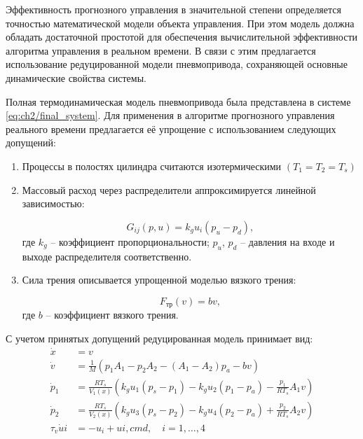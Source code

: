 Эффективность прогнозного управления в значительной степени определяется точностью
математической модели объекта управления. При этом модель должна обладать достаточной
простотой для обеспечения вычислительной эффективности алгоритма управления в
реальном времени. В связи с этим предлагается использование редуцированной
модели пневмопривода, сохраняющей основные динамические свойства системы.

Полная термодинамическая модель пневмопривода была представлена в системе \ref{eq:ch2/final_system}. Для применения в
алгоритме прогнозного управления реального времени предлагается её упрощение с использованием следующих допущений:

\begin{enumerate}
	\item Процессы в полостях цилиндра считаются изотермическими $(T_1 = T_2 = T_s)$
	\item Массовый расход через распределители аппроксимируется линейной зависимостью:

	      \begin{equation}
		      G_{ij}(p,u) = k_g u_i (p_u - p_d),
	      \end{equation}
	      где $k_g$ -- коэффициент пропорциональности;
	      $p_u$, $p_d$ -- давления на входе и выходе распределителя соответственно.

	\item Сила трения описывается упрощенной моделью вязкого трения:

	      \begin{equation}
		      F_{\text{тр}}(v) = b v,
	      \end{equation}
	      где $b$ -- коэффициент вязкого трения.
\end{enumerate}

С учетом принятых допущений редуцированная модель принимает вид:
\begin{equation}
	\begin{aligned}
		\dot{x}        & = v                                                                                   \\
		\dot{v}        & = \frac{1}{M}(p_1A_1 - p_2A_2 - (A_1-A_2)p_a - bv)                                    \\
		\dot{p}_1      & = \frac{RT_s}{V_1(x)}(k_g u_1(p_s - p_1) - k_g u_2(p_1 - p_a) - \frac{p_1}{RT_s}A_1v) \\
		\dot{p}_2      & = \frac{RT_s}{V_2(x)}(k_g u_3(p_s - p_2) - k_g u_4(p_2 - p_a) + \frac{p_2}{RT_s}A_2v) \\
		\tau_v\dot{u}i & = -u_i + u{i,cmd}, \quad i = 1,\ldots,4
	\end{aligned}
\end{equation}

